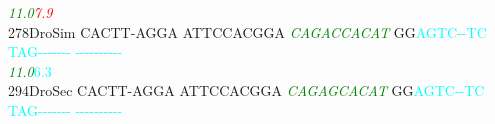 \documentclass[11pt,twoside,reqno,a4paper]{article}
\begin{document}
{\hspace*{4\charwidth}\hspace*{7\charwidth}\hspace*{1\charwidth}\hspace*{1\charwidth}\hspace*{20\charwidth}\textit{\textcolor{green}{11.0}}\hspace*{1\charwidth}\hspace*{7\charwidth}\textit{\textcolor{red}{7.9}}\hspace*{1\charwidth}\hspace*{1\charwidth}\hspace*{1\charwidth}\\
278\hspace*{1\charwidth}DroSim	CACTT-AGGA	ATTCCACGGA	\textit{\textcolor{green}{C}}\textit{\textcolor{green}{A}}\textit{\textcolor{green}{G}}\textit{\textcolor{green}{A}}\textit{\textcolor{green}{C}}\textit{\textcolor{green}{C}}\textit{\textcolor{green}{A}}\textit{\textcolor{green}{C}}\textit{\textcolor{green}{A}}\textit{\textcolor{green}{T}}	GG\textcolor{cyan}{A}\textcolor{cyan}{G}\textcolor{cyan}{T}\textcolor{cyan}{C}\textcolor{cyan}{-}\textcolor{cyan}{-}\textcolor{cyan}{T}\textcolor{cyan}{C}	\textcolor{cyan}{T}\textcolor{cyan}{A}\textcolor{cyan}{G}\textcolor{cyan}{-}\textcolor{cyan}{-}\textcolor{cyan}{-}\textcolor{cyan}{-}\textcolor{cyan}{-}\textcolor{cyan}{-}\textcolor{cyan}{-}	\textcolor{cyan}{-}\textcolor{cyan}{-}\textcolor{cyan}{-}\textcolor{cyan}{-}\textcolor{cyan}{-}\textcolor{cyan}{-}\textcolor{cyan}{-}\textcolor{cyan}{-}\textcolor{cyan}{-}\textcolor{cyan}{-}	\\
\hspace*{4\charwidth}\hspace*{7\charwidth}\hspace*{1\charwidth}\hspace*{1\charwidth}\hspace*{20\charwidth}\textit{\textcolor{green}{11.0}}\hspace*{1\charwidth}\hspace*{8\charwidth}\textcolor{cyan}{6.3}\hspace*{1\charwidth}\hspace*{1\charwidth}\hspace*{1\charwidth}\\
294\hspace*{1\charwidth}DroSec	CACTT-AGGA	ATTCCACGGA	\textit{\textcolor{green}{C}}\textit{\textcolor{green}{A}}\textit{\textcolor{green}{G}}\textit{\textcolor{green}{A}}\textit{\textcolor{green}{G}}\textit{\textcolor{green}{C}}\textit{\textcolor{green}{A}}\textit{\textcolor{green}{C}}\textit{\textcolor{green}{A}}\textit{\textcolor{green}{T}}	GG\textcolor{cyan}{A}\textcolor{cyan}{G}\textcolor{cyan}{T}\textcolor{cyan}{C}\textcolor{cyan}{-}\textcolor{cyan}{-}\textcolor{cyan}{T}\textcolor{cyan}{C}	\textcolor{cyan}{T}\textcolor{cyan}{A}\textcolor{cyan}{G}\textcolor{cyan}{-}\textcolor{cyan}{-}\textcolor{cyan}{-}\textcolor{cyan}{-}\textcolor{cyan}{-}\textcolor{cyan}{-}\textcolor{cyan}{-}	\textcolor{cyan}{-}\textcolor{cyan}{-}\textcolor{cyan}{-}\textcolor{cyan}{-}\textcolor{cyan}{-}\textcolor{cyan}{-}\textcolor{cyan}{-}\textcolor{cyan}{-}\textcolor{cyan}{-}\textcolor{cyan}{-}	\\
}
\end{document}
